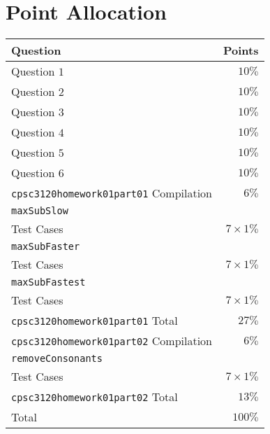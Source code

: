 \documentclass[addpoints,letter,11pt]{exam}
\begin{document}
\section*{Point Allocation}
\begin{table}[H]
  \center
  \begin{tabular}{|l|r|}
    \hline
    Question & Points\\
    \hline
    \hline
    Question $1$ & $10\%$\\
    Question $2$ & $10\%$\\
    Question $3$ & $10\%$\\
    Question $4$ & $10\%$\\
    Question $5$ & $10\%$\\
    Question $6$ & $10\%$\\
    \hline
	\verb+cpsc3120homework01part01+ Compilation & $6\%$\\
    \verb+maxSubSlow+ & \\
    Test Cases & $7\times 1\%$\\
    \verb+maxSubFaster+ & \\
    Test Cases & $7\times 1\%$\\
    \verb+maxSubFastest+ & \\
    Test Cases & $7\times 1\%$\\
\hline
\verb+cpsc3120homework01part01+ Total & $27\%$\\
\hline
	\verb+cpsc3120homework01part02+ Compilation & $6\%$\\
    \verb+removeConsonants+ & \\
    Test Cases & $7\times 1\%$\\
    \hline
\verb+cpsc3120homework01part02+ Total & $13\%$\\
\hline
    \hline
    Total & $100\%$\\
    \hline
  \end{tabular}
\end{table}
\end{document}
